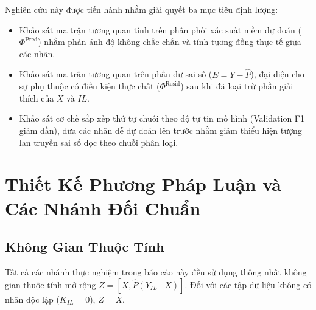 \documentclass[11pt,a4paper]{article}
\begin{document}
Nghiên cứu này được tiến hành nhằm giải quyết ba mục tiêu định lượng:
\begin{itemize}[leftmargin=*]
  \item Khảo sát ma trận tương quan tính trên phân phối xác suất mềm dự đoán ($\Phi^{\text{Pred}}$) nhằm phản ánh độ không chắc chắn và tính tương đồng thực tế giữa các nhãn.
  \item Khảo sát ma trận tương quan trên phần dư sai số ($E = Y - \hat{P}$), đại diện cho sự phụ thuộc có điều kiện thực chất ($\Phi^{\text{Resid}}$) sau khi đã loại trừ phần giải thích của $X$ và $IL$.
  \item Khảo sát cơ chế sắp xếp thứ tự chuỗi theo độ tự tin mô hình (Validation F1 giảm dần), đưa các nhãn dễ dự đoán lên trước nhằm giảm thiểu hiện tượng lan truyền sai số dọc theo chuỗi phân loại.
\end{itemize}

\section{Thiết Kế Phương Pháp Luận và Các Nhánh Đối Chuẩn}

\subsection{Không Gian Thuộc Tính}
Tất cả các nhánh thực nghiệm trong báo cáo này đều sử dụng thống nhất không gian thuộc tính mở rộng $Z = [X, \hat{P}(Y_{IL} \mid X)]$. Đối với các tập dữ liệu không có nhãn độc lập ($K_{IL} = 0$), $Z = X$.
\end{document}
